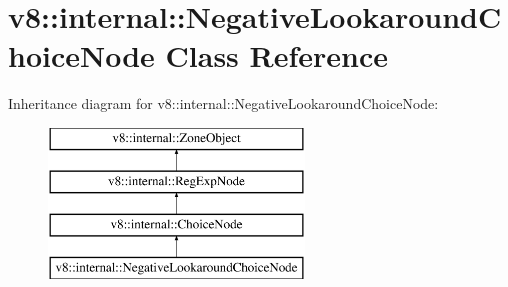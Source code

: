 \hypertarget{classv8_1_1internal_1_1_negative_lookaround_choice_node}{}\section{v8\+:\+:internal\+:\+:Negative\+Lookaround\+Choice\+Node Class Reference}
\label{classv8_1_1internal_1_1_negative_lookaround_choice_node}
Inheritance diagram for v8\+:\+:internal\+:\+:Negative\+Lookaround\+Choice\+Node\+:\begin{figure}[H]
\begin{center}
\leavevmode
\includegraphics[height=4.000000cm]{classv8_1_1internal_1_1_negative_lookaround_choice_node}
\end{center}
\end{figure}

